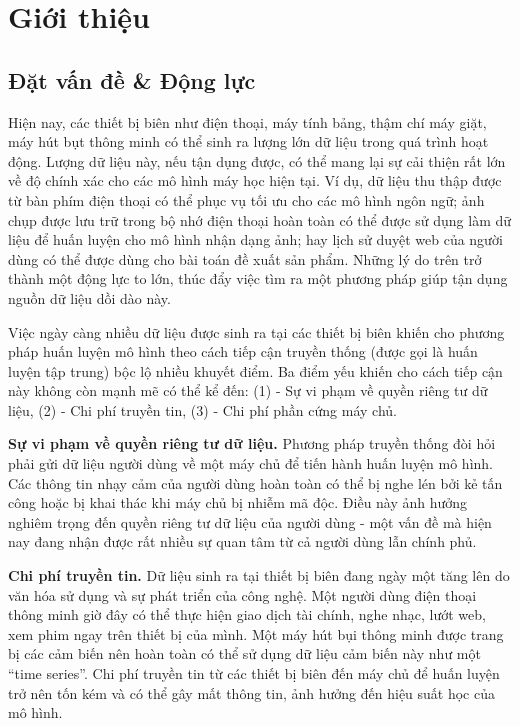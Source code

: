 \chapter{Giới thiệu}
\label{Chapter1}

\section{Đặt vấn đề \& Động lực}

Hiện nay, các thiết bị biên như điện thoại, máy tính bảng, thậm chí máy giặt, máy hút bụt thông minh có thể sinh ra lượng lớn dữ liệu trong quá trình hoạt động. Lượng dữ liệu này, nếu tận dụng được, có thể mang lại sự cải thiện rất lớn về độ chính xác cho các mô hình máy học hiện tại. Ví dụ, dữ liệu thu thập được từ bàn phím điện thoại có thể phục vụ tối ưu cho các mô hình ngôn ngữ; ảnh chụp được lưu trữ trong bộ nhớ điện thoại hoàn toàn có thể được sử dụng làm dữ liệu để huấn luyện cho mô hình nhận dạng ảnh; hay lịch sử duyệt web của người dùng có thể được dùng cho bài toán đề xuất sản phẩm. Những lý do trên trở thành một động lực to lớn, thúc đẩy việc tìm ra một phương pháp giúp tận dụng nguồn dữ liệu dồi dào này.

Việc ngày càng nhiều dữ liệu được sinh ra tại các thiết bị biên khiến cho phương pháp huấn luyện mô hình theo cách tiếp cận truyền thống (được gọi là huấn luyện tập trung) bộc lộ nhiều khuyết điểm. Ba điểm yếu khiến cho cách tiếp cận này không còn mạnh mẽ có thể kể đến: (1) - Sự vi phạm về quyền riêng tư dữ liệu, (2) - Chi phí truyền tin, (3) - Chi phí phần cứng máy chủ.

\textbf{Sự vi phạm về quyền riêng tư dữ liệu.} Phương pháp truyền thống đòi hỏi phải gửi dữ liệu người dùng về một máy chủ để tiến hành huấn luyện mô hình. Các thông tin nhạy cảm của người dùng hoàn toàn có thể bị nghe lén bởi kẻ tấn công hoặc bị khai thác khi máy chủ bị nhiễm mã độc. Điều này ảnh hưởng nghiêm trọng đến quyền riêng tư dữ liệu của người dùng - một vấn đề mà hiện nay đang nhận được rất nhiều sự quan tâm từ cả người dùng lẫn chính phủ.

\textbf{Chi phí truyền tin.} Dữ liệu sinh ra tại thiết bị biên đang ngày một tăng lên do văn hóa sử dụng và sự phát triển của công nghệ. Một người dùng điện thoại thông minh giờ đây có thể thực hiện giao dịch tài chính, nghe nhạc, lướt web, xem phim ngay trên thiết bị của mình. Một máy hút bụi thông minh được trang bị các cảm biến nên hoàn toàn có thể sử dụng dữ liệu cảm biến này như một “time series”. Chi phí truyền tin từ các thiết bị biên đến máy chủ để huấn luyện trở nên tốn kém và có thể gây mất thông tin, ảnh hưởng đến hiệu suất học của mô hình.

